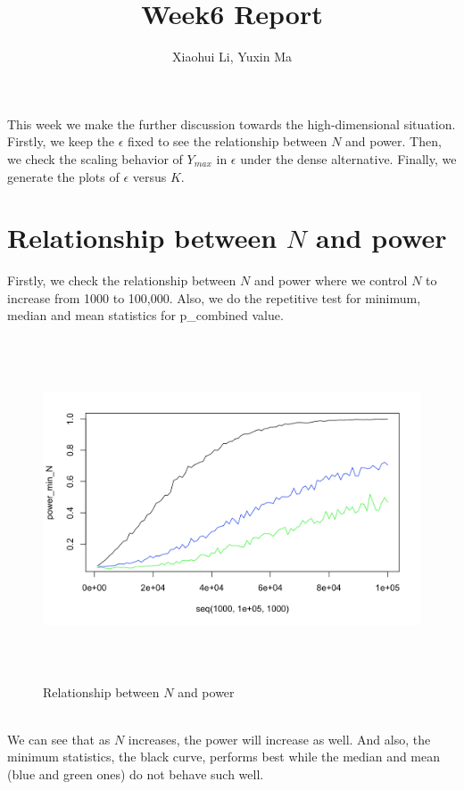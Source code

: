 \documentclass[10pt,english]{article}\usepackage{graphicx, color}
\numberwithin{equation}{section}
\numberwithin{figure}{section}
\begin{document}
\title{Week6 Report}


\author{Xiaohui Li, Yuxin Ma}

\maketitle

This week we make the further discussion towards the high-dimensional situation. Firstly, we keep the $\epsilon$ fixed to see the relationship between $N$ and power. Then, we check the scaling behavior of $Y_{max}$ in $\epsilon$ under the dense alternative. Finally, we generate the plots of $\epsilon$ versus $K$. 

\section{Relationship between $N$ and power}
Firstly, we check the relationship between $N$ and power where we control $N$ to increase from 1000 to 100,000. Also, we do the repetitive test for minimum, median and mean statistics for p\_combined value.\\
\begin{figure}[htbp]
\centering\includegraphics[width=6in, height=4in]{N}
\caption{Relationship between $N$ and power}
\end{figure}
\quad\\
We can see that as $N$ increases, the power will increase as well. And also, the minimum statistics, the black curve, performs best while the median and mean (blue and green ones) do not behave such well.
\end{document}
